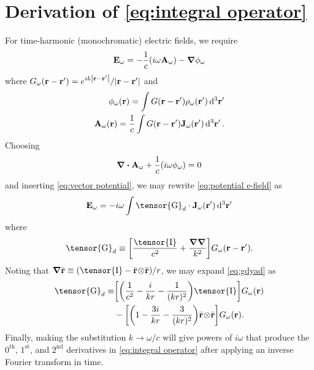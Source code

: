\section{Derivation of \cref{eq:integral operator}}

For time-harmonic (monochromatic) electric fields, we require
\begin{equation}
  \vb{E}_\omega = - \frac{1}{c} \qty(i \omega \vb{A}_\omega) - \grad \phi_\omega
  \label{eq:potential e-field}
\end{equation}
where $G_\omega(\vb{r} - \vb{r}') = e^{i k \abs{\vb{r} - \vb{r}'}}/\abs{\vb{r} - \vb{r}'}$ and 
\begin{subequations}
  \begin{align}
      \phi_\omega(\vb{r}) = \int G(\vb{r} - \vb{r}') \rho_\omega(\vb{r}') \dd[3]{\vb{r}'} \label{eq:scalar potential} \\
    \vb{A}_\omega(\vb{r}) = \frac{1}{c} \int G(\vb{r} - \vb{r}') \vb{J}_\omega(\vb{r}') \dd[3]{\vb{r}'}. \label{eq:vector potential}
  \end{align}
\end{subequations}
Choosing
\begin{equation}
  \div{\vb{A}_\omega} + \frac{1}{c} \qty(i \omega \phi_\omega) = 0 
\end{equation}
and inserting \cref{eq:vector potential}, we may rewrite \cref{eq:potential e-field} as
\begin{equation}
  \vb{E}_\omega = -i \omega \int \tensor{\mathrm{G}}_d \cdot \vb{J}_\omega(\vb{r}') \dd[3]{\vb{r}'}
\end{equation}
where
\begin{equation}
  \tensor{\mathrm{G}}_d \equiv \qty[ \frac{\tensor{\mathrm{I}}}{c^2} + \frac{\grad\grad}{k^2} ] G_\omega(\vb{r} - \vb{r}').
  \label{eq:gdyad}
\end{equation}
Noting that $\grad{\bar{\vb{r}}} \equiv (\tensor{\mathrm{I}} - \outerprod{\bar{\vb{r}}}{\bar{\vb{r}}})/r$, we may expand \cref{eq:gdyad} as
\begin{equation}
  \begin{aligned}
    \tensor{\mathrm{G}}_d \equiv &  \qty[ \qty(\frac{1}{c^2} - \frac{i}{k r} - \frac{1}{(kr)^2})\tensor{\mathrm{I}} ] G_\omega(\vb{r}) \\
    &- \qty[ \qty(1 - \frac{3i}{kr} - \frac{3}{(kr)^2}) \outerprod{\bar{\vb{r}}}{\bar{\vb{r}}} ] G_\omega(\vb{r}).
  \end{aligned}
\end{equation}
Finally, making the substitution $k \to \omega/c$ will give powers of $i \omega$ that produce the $0^\text{th}$, $1^\text{st}$, and $2^\text{nd}$ derivatives in \cref{eq:integral operator} after applying an inverse Fourier transform in time.
